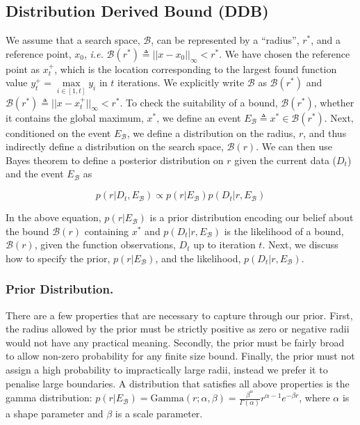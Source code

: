 \documentclass[preprint]{elsarticle}
\begin{document}
\subsection{Distribution Derived Bound (DDB)}
We assume that a search space, $\mathcal{B}$, can be represented by a ``radius'', $r^*$, and a reference point, $x_0$, \emph{i.e.} $\mathcal{B}(r^*)\triangleq||x-x_0||_\infty<r^*$. We have  chosen the reference point as $x_t^+$, which is the location corresponding to the largest found function value $y_t^+=\underset{i\in[1,t]}{\max}y_i$ in $t$ iterations. We explicitly write $\mathcal{B}$ as $\mathcal{B}(r^*)$ and $\mathcal{B}(r^*)\triangleq||x-x_t^+||_\infty<r^*$. 
To check the suitability of a bound, $\mathcal{B}(r^*)$, whether it contains the global maximum, $x^*$, we define an event $E_{\mathcal{B}}\triangleq x^*\in \mathcal{B}(r^*)$. Next, conditioned on the event $E_{\mathcal{B}}$, we define a distribution on the radius, $r$, and thus indirectly define a distribution on 
the search space, ${\mathcal{B}(r)}$. We can then use Bayes theorem  to define a posterior distribution on $r$ given the current data ($D_t$) and the event $E_{\mathcal{B}}$ as
\begin{linenomath*}
\begin{equation}
p(r|D_t,E_{\mathcal{B}})\propto p(r|E_{\mathcal{B}})p(D_t|r,E_{\mathcal{B}}) \label{eqn:ddb_bayes_r}
\end{equation} 
\end{linenomath*}
In the above equation, $p(r|E_{\mathcal{B}})$ is a prior distribution encoding our belief about the bound $\mathcal{B}(r)$ containing $x^*$ and $p(D_t|r,E_{\mathcal{B}})$ is the likelihood of a bound, $\mathcal{B}(r)$, given the function observations, $D_t$ up to iteration $t$.
Next, we discuss how to specify the prior, $p(r|E_{\mathcal{B}})$, and the likelihood, $p(D_t|r,E_{\mathcal{B}})$.


\subsubsection{Prior Distribution.}
There are a few properties that are necessary to capture through our prior. First, the radius allowed by the prior must be strictly positive as zero or negative radii would not have any practical meaning. Secondly, the prior must be fairly broad to allow non-zero probability for any finite size bound. Finally, the prior must not assign a high probability to impractically large radii, instead we prefer it to penalise large boundaries. A distribution that satisfies all above properties is the gamma distribution: $p(r|E_{\mathcal{B}})=\text{Gamma}(r;\alpha,\beta)=\frac{\beta^\alpha}{\Gamma(\alpha)}r^{\alpha-1}e^{-\beta r}$, where $\alpha$ is a shape parameter and $\beta$ is a scale parameter. 
\end{document}
